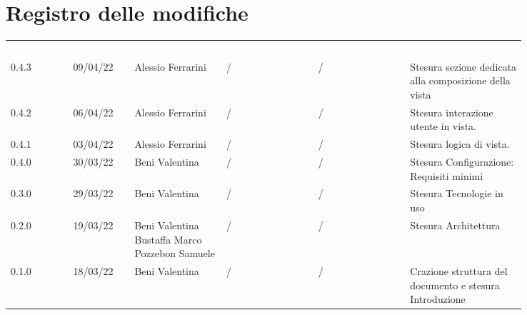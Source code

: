 \section*{Registro delle modifiche}

{\renewcommand{\arraystretch}{1.5}
\scriptsize
\begin{tabular}{p{0.10\linewidth}p{0.10\linewidth}p{0.15\linewidth}p{0.15\linewidth}p{0.15\linewidth}p{0.19\linewidth}}
	\rowcolor[RGB]{33, 73, 50}
	\textcolor{white}{\textbf{Versione}} & \textcolor{white}{\textbf{Data}} &
	\textcolor{white}{\textbf{Redattore}} & \textcolor{white}{\textbf{Verificatore}} &
	\textcolor{white}{\textbf{Approvatore}} & \textcolor{white}{\textbf{Descrizione}}\\
	\rowcolor[RGB]{216, 235, 171}
	0.4.3 & 09/04/22 & Alessio Ferrarini & / & / & Stesura sezione dedicata alla
  composizione della vista \\
	\rowcolor[RGB]{233, 245, 206}
	0.4.2 & 06/04/22 & Alessio Ferrarini & / & / & Stesura interazione utente in
  vista. \\
	\rowcolor[RGB]{216, 235, 171}
	0.4.1 & 03/04/22 & Alessio Ferrarini & / & / & Stesura logica di vista. \\
	\rowcolor[RGB]{233, 245, 206}
	0.4.0 & 30/03/22 & Beni Valentina & / & / & Stesura Configurazione: Requisiti minimi\\
	\rowcolor[RGB]{216, 235, 171}
	0.3.0 & 29/03/22 & Beni Valentina & / & / & Stesura Tecnologie in uso\\
	\rowcolor[RGB]{233, 245, 206}
	0.2.0 & 19/03/22 & Beni Valentina Bustaffa Marco Pozzebon Samuele & / & / & Stesura Architettura\\
	\rowcolor[RGB]{216, 235, 171}
	0.1.0 & 18/03/22 & Beni Valentina & / & / & Crazione struttura del documento e stesura Introduzione\\	
\end{tabular}	
}
